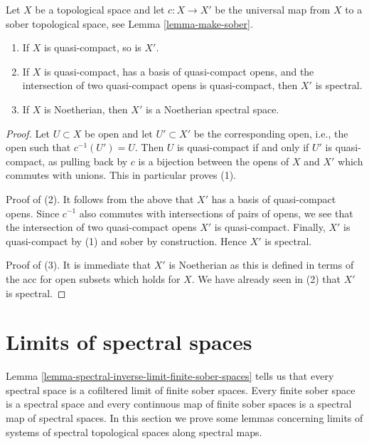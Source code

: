 \begin{lemma}
\label{lemma-Noetherian-goes-to-spectral}
Let $X$ be a topological space and let $c : X \to X'$ be the universal
map from $X$ to a sober topological space, see
Lemma \ref{lemma-make-sober}.
\begin{enumerate}
\item If $X$ is quasi-compact, so is $X'$.
\item If $X$ is quasi-compact, has a basis of quasi-compact opens,
and the intersection of two quasi-compact opens is quasi-compact, then
$X'$ is spectral.
\item If $X$ is Noetherian, then $X'$ is a Noetherian spectral space.
\end{enumerate}
\end{lemma}

\begin{proof}
Let $U \subset X$ be open and let $U' \subset X'$ be the corresponding
open, i.e., the open such that $c^{-1}(U') = U$.
Then $U$ is quasi-compact if and only if $U'$ is quasi-compact,
as pulling back by $c$ is a bijection between the opens of
$X$ and $X'$ which commutes with unions. This in particular proves (1).

\medskip\noindent
Proof of (2). It follows from the above that $X'$ has a basis of
quasi-compact opens. Since $c^{-1}$ also
commutes with intersections of pairs of opens, we see that
the intersection of two quasi-compact opens $X'$ is quasi-compact.
Finally, $X'$ is quasi-compact by (1) and sober by construction.
Hence $X'$ is spectral.

\medskip\noindent
Proof of (3). It is immediate that $X'$ is Noetherian as this is defined
in terms of the acc for open subsets which holds for $X$. We have
already seen in (2) that $X'$ is spectral.
\end{proof}




\section{Limits of spectral spaces}
\label{section-limits-spectral}

\noindent
Lemma \ref{lemma-spectral-inverse-limit-finite-sober-spaces} tells us
that every spectral space is a cofiltered limit of finite sober
spaces. Every finite sober space is a spectral space and every continuous
map of finite sober spaces is a spectral map of spectral spaces.
In this section we prove some lemmas concerning limits of systems
of spectral topological spaces along spectral maps.


